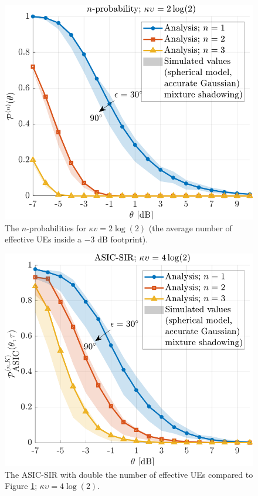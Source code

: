 \documentclass[lettersize,journal]{IEEEtran}
\begin{document}
\begin{figure}[h]
  \centering
  \includegraphics[width=\linewidth]{nprobability.pdf}
  \caption{The $n$-probabilities for $\kappa v=2 \log(2)$ (the average number of effective UEs inside a $-3$ dB footprint). 
} 
  \label{fig:nprobability}
\end{figure}


  
\begin{figure}[h]
  \centering
  \includegraphics[width=\linewidth]{ASICSIR.pdf}
  \caption{The ASIC-SIR with double the  number of effective UEs compared to Figure \ref{fig:nprobability}; $\kappa \upsilon = 4 \log(2)$. } 
  \label{fig:ASICSIR}
\end{figure}
\end{document}

